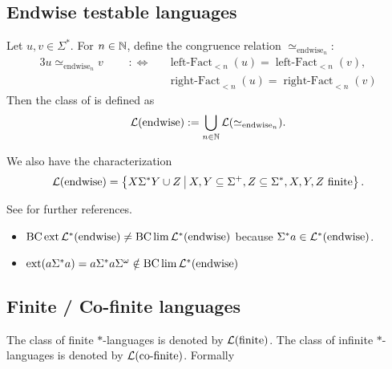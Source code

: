 
\subsection{Endwise testable languages}
\label{lang:endwise}
Let $u,v \in \Sigma^*$. For $n \in \mathbb{N}$, define the congruence relation $\simeq_{\text{endwise}_n}$:
\begin{alignat*}{3}
u \simeq_{\text{endwise}_n} v \ \ \ && :\Leftrightarrow \ \ \ & \operatorname{left-Fact}_{<n}(u) = \operatorname{left-Fact}_{<n}(v) , \\
&&& \operatorname{right-Fact}_{<n}(u) = \operatorname{right-Fact}_{<n}(v)
\end{alignat*}
Then the class of  is defined as
\[ \mathcal{L}(\textup{\textrm{endwise}}) := \bigcup_{n\in\mathbb{N}} \mathcal{L}(\simeq_{\text{endwise}_n}) . \]

We also have the characterization
\[ \Lang(\mathtext{endwise}) = \Set{X \Sigma^* Y \cup Z}{X,Y \subseteq \Sigma^+, Z \subseteq \Sigma^*, \text{$X,Y,Z$ finite}} . \]

See \cite[Section 2.4]{ConcHierR104} for further references.

\begin{itemize}
\item $\operatorname{BC} \operatorname{ext} \mathcal{L}^*(\textup{\textrm{endwise}}) \neq \operatorname{BC} \lim \mathcal{L}^*(\textup{\textrm{endwise}})$ because $\Sigma^*a \in \mathcal{L}^*(\textup{\textrm{endwise}})$.
\item $\operatorname{ext}(a\Sigma^* a) = a \Sigma^* a \Sigma^\omega \notin \operatorname{BC} \lim \mathcal{L}^*(\textup{\textrm{endwise}})$
\end{itemize}

\subsection{Finite / Co-finite languages}
\label{lang:finite}

The class of finite $*$-languages is denoted by $\mathcal{L}(\textup{\textrm{finite}})$. The class of infinite $*$-languages is denoted by $\mathcal{L}(\textup{\textrm{co-finite}})$. Formally

